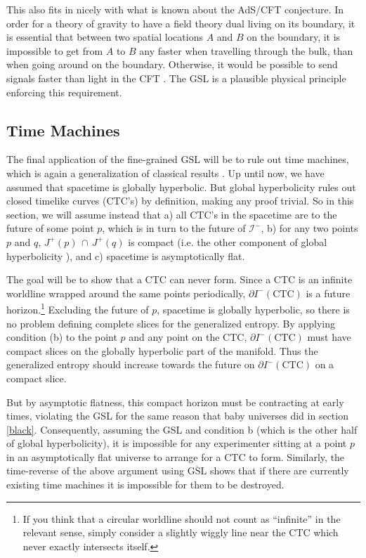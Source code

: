 \documentclass{article}
\begin{document}
This also fits in nicely with what is known about the AdS/CFT conjecture.  In order for a theory of gravity to have a field theory dual living on its boundary, it is essential that between two spatial locations $A$ and $B$ on the boundary, it is impossible to get from $A$ to $B$ any faster when travelling through the bulk, than when going around on the boundary.  Otherwise, it would be possible to send signals faster than light in the CFT \cite{PSW02}.  The GSL is a plausible physical principle enforcing this requirement.

\subsection{Time Machines}\label{time}

The final application of the fine-grained GSL will be to rule out time machines, which is again a generalization of classical results \cite{noctc}.  Up until now, we have assumed that spacetime is globally hyperbolic.  But global hyperbolicity rules out closed timelike curves (CTC's) by definition, making any proof trivial.  So in this section, we will assume instead that a) all CTC's in the spacetime are to the future of some point $p$, which is in turn to the future of $\mathcal{I}^-$, b) for any two points $p$ and $q$, $J^+(p)\,\cap\,J^+(q)$ is compact (i.e. the other component of global hyperbolicity \cite{BernalSanchez}), and c) spacetime is asymptotically flat.
  
The goal will be to show that a CTC can never form.  Since a CTC is an infinite worldline wrapped around the same points periodically, $\partial I^-(\mathrm{CTC})$ is a future horizon.\footnote{If you think that a circular worldline should not count as ``infinite'' in the relevant sense, simply consider a slightly wiggly line near the CTC which never exactly intersects itself.}  Excluding the future of $p$, spacetime is globally hyperbolic, so there is no problem defining complete slices for the generalized entropy.  By applying condition (b) to the point $p$ and any point on the CTC, $\partial I^-(\mathrm{CTC})$ must have compact slices on the globally hyperbolic part of the manifold.  Thus the generalized entropy should increase towards the future on $\partial I^-(\mathrm{CTC})$ on a compact slice.

But by asymptotic flatness, this compact horizon must be contracting at early times, violating the GSL for the same reason that baby universes did in section \ref{black}.  Consequently, assuming the GSL and condition b (which is the other half of global hyperbolicity), it is impossible for any experimenter sitting at a point $p$ in an asymptotically flat universe to arrange for a CTC to form.  Similarly, the time-reverse of the above argument using  $\overline{\mathrm{GSL}}$ shows that if there are currently existing time machines it is impossible for them to be destroyed.
\end{document}

